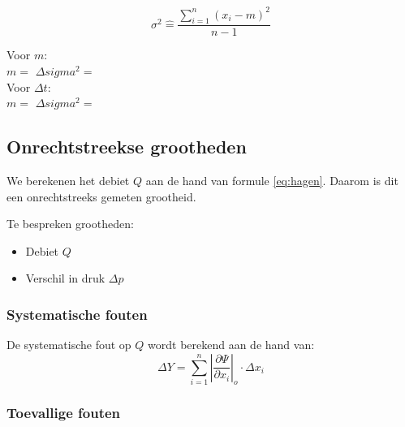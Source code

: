 \begin{equation}
    \sigma^{2} \hat{=} \frac{\sum\limits_{i=1}^n (x_i - m)^2}{n - 1}
\end{equation} 

Voor $m$: \\
$m = $ %
$\Delta sigma^{2} = $ %
\\
Voor $\Delta t$:\\
$m = $ %
$\Delta sigma^{2} = $ %



\subsection{Onrechtstreekse grootheden}

We berekenen het debiet $Q$ aan de hand van formule \eqref{eq:hagen}. Daarom is dit een onrechtstreeks gemeten grootheid.

Te bespreken grootheden:
\begin{itemize}
    \item Debiet $Q$
    \item Verschil in druk $\Delta p$
\end{itemize}

\subsubsection{Systematische fouten}
De systematische fout op $Q$ wordt berekend aan de hand van:
\begin{equation}
    \Delta Y = \sum\limits_{i=1}^n \left|\frac{\partial \Psi}{\partial x_i}\right|_o \cdot \Delta x_i
\end{equation}

\subsubsection{Toevallige fouten}

